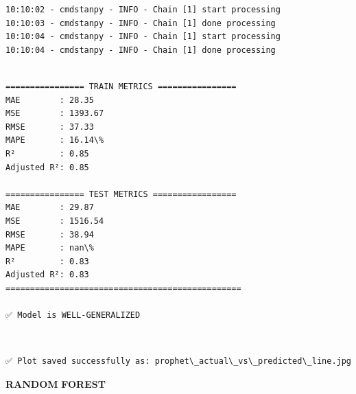 \documentclass[11pt]{article}
\begin{document}
    \begin{Verbatim}[commandchars=\\\{\}]
10:10:02 - cmdstanpy - INFO - Chain [1] start processing
10:10:03 - cmdstanpy - INFO - Chain [1] done processing
10:10:04 - cmdstanpy - INFO - Chain [1] start processing
10:10:04 - cmdstanpy - INFO - Chain [1] done processing
    \end{Verbatim}

    \begin{Verbatim}[commandchars=\\\{\}]

================ TRAIN METRICS ================
MAE        : 28.35
MSE        : 1393.67
RMSE       : 37.33
MAPE       : 16.14\%
R²         : 0.85
Adjusted R²: 0.85

================ TEST METRICS =================
MAE        : 29.87
MSE        : 1516.54
RMSE       : 38.94
MAPE       : nan\%
R²         : 0.83
Adjusted R²: 0.83
================================================

✅ Model is WELL-GENERALIZED
    \end{Verbatim}

    \begin{center}
    \end{center}
    { \hspace*{\fill} \\}
    
    \begin{Verbatim}[commandchars=\\\{\}]
✅ Plot saved successfully as: prophet\_actual\_vs\_predicted\_line.jpg
    \end{Verbatim}

    \textbf{RANDOM} \textbf{FOREST}
\end{document}
